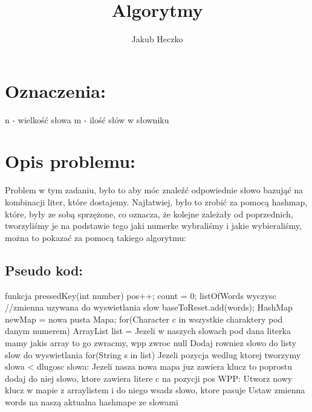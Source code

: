 \documentclass[12pt]{article}
\begin{document}
\title{{\Large}Algorytmy}
\date{}
\author{Jakub Heczko}

\maketitle
\section{Oznaczenia:}
n - wielkość słowa\newline
m - ilość słów w słowniku
\section{Opis problemu:}
Problem w tym zadaniu, było to aby móc znaleźć odpowiednie słowo bazująć na kombinacji liter, które dostajemy. Najłatwiej, było to zrobić za pomocą hashmap, które, były ze sobą sprzężone, co oznacza, że kolejne zależały od poprzednich, tworzyliśmy je na podstawie tego jaki numerke wybraliśmy i jakie wybieraliśmy, można to pokazać za pomocą takiego algorytmu:
\subsection*{Pseudo kod: }
funkcja pressedKey(int number){\newline
    pos++;\newline
    count = 0;\newline
    listOfWords wyczysc //zmienna uzywana do wyswietlania slow\newline
    baseToReset.add(words);\newline
    HashMap newMap = nowa pusta Mapa;\newline
    for(Character c in wszystkie charaktery pod danym numerem){\newblock\newline
        ArrayList list = Jezeli w naszych slowach pod dana literka mamy jakis array to go zwracmy, wpp zwroc null\newblock\newline
        Dodaj rowniez slowo do listy slow do wyswietlania
        for(String s in list){\newblock\newline
            Jezeli pozycja wedlug ktorej tworzymy slowa < dlugosc slowa:\newline
                Jezeli nasza nowa mapa juz zawiera klucz to poprostu dodaj do niej slowo, ktore zawiera litere c na pozycji pos\newline
            WPP: Utworz nowy klucz w mapie z arraylistem i do niego wsadz slowo, ktore pasuje\newline
    Ustaw zmienna words na naszą aktualna hashmape ze slowami\newline
        }\newline
    }\newline
}\newline
\end{document}
